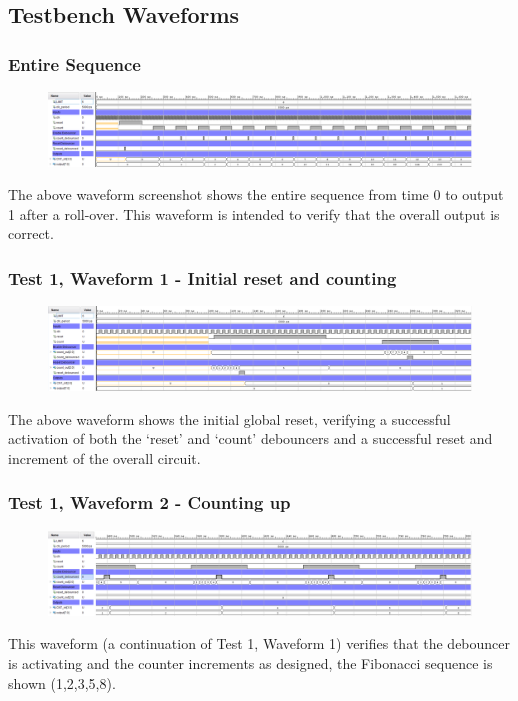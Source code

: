 \documentclass[11pt]{report}
\begin{document}
\subsection*{Testbench Waveforms}

\subsubsection*{Entire Sequence}
\begin{figure}[H]
    \includegraphics[width=\columnwidth]{Reports/Lab1/Waveforms/01_entire-sequence.png}
\end{figure}
The above waveform screenshot shows the entire sequence from time 0 to output 1 after a roll-over. This waveform is intended to verify that the overall output is correct.

\subsubsection*{Test 1, Waveform 1 - Initial reset and counting}
\begin{figure}[H]
    \includegraphics[width=\columnwidth]{Reports/Lab1/Waveforms/02_initial-reset-and-counting.png}
\end{figure}
The above waveform shows the initial global reset, verifying a successful activation of both the `reset' and `count' debouncers and a successful reset and increment of the overall circuit. 

\subsubsection*{Test 1, Waveform 2 - Counting up}
\begin{figure}[H]
    \includegraphics[width=\columnwidth]{Reports/Lab1/Waveforms/03_counting-up.png}
\end{figure}
This waveform (a continuation of Test 1, Waveform 1) verifies that the debouncer is activating and the counter increments as designed, the Fibonacci sequence is shown (1,2,3,5,8).
\end{document}
